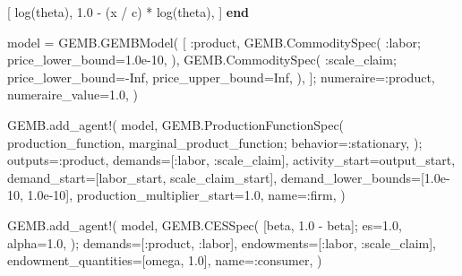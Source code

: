 \documentclass[
  letterpaper,
  DIV=11,
  numbers=noendperiod]{scrreprt}
\newenvironment{Shaded}{\begin{snugshade}}{\end{snugshade}}
\newcommand{\ConstantTok}[1]{\textcolor[rgb]{0.56,0.35,0.01}{#1}}
\newcommand{\ControlFlowTok}[1]{\textcolor[rgb]{0.00,0.23,0.31}{\textbf{#1}}}
\newcommand{\FloatTok}[1]{\textcolor[rgb]{0.68,0.00,0.00}{#1}}
\newcommand{\FunctionTok}[1]{\textcolor[rgb]{0.28,0.35,0.67}{#1}}
\newcommand{\NormalTok}[1]{\textcolor[rgb]{0.00,0.23,0.31}{#1}}
\newcommand{\OperatorTok}[1]{\textcolor[rgb]{0.37,0.37,0.37}{#1}}
\begin{document}
\begin{codelisting}
{\begin{Shaded}
\begin{Highlighting}[]
\NormalTok{    [}
        \FunctionTok{log}\NormalTok{(theta),}
        \FloatTok{1.0} \OperatorTok{{-}}\NormalTok{ (x }\OperatorTok{/}\NormalTok{ c) }\OperatorTok{*} \FunctionTok{log}\NormalTok{(theta),}
\NormalTok{    ]}
\ControlFlowTok{end}

\NormalTok{model }\OperatorTok{=}\NormalTok{ GEMB.}\FunctionTok{GEMBModel}\NormalTok{(}
\NormalTok{    [}
        \OperatorTok{:}\NormalTok{product,}
\NormalTok{        GEMB.}\FunctionTok{CommoditySpec}\NormalTok{(}
            \OperatorTok{:}\NormalTok{labor;}
\NormalTok{            price\_lower\_bound}\OperatorTok{=}\FloatTok{1.0e{-}10}\NormalTok{,}
\NormalTok{        ),}
\NormalTok{        GEMB.}\FunctionTok{CommoditySpec}\NormalTok{(}
            \OperatorTok{:}\NormalTok{scale\_claim;}
\NormalTok{            price\_lower\_bound}\OperatorTok{={-}}\ConstantTok{Inf}\NormalTok{,}
\NormalTok{            price\_upper\_bound}\OperatorTok{=}\ConstantTok{Inf}\NormalTok{,}
\NormalTok{        ),}
\NormalTok{    ];}
\NormalTok{    numeraire}\OperatorTok{=:}\NormalTok{product,}
\NormalTok{    numeraire\_value}\OperatorTok{=}\FloatTok{1.0}\NormalTok{,}
\NormalTok{)}

\NormalTok{GEMB.}\FunctionTok{add\_agent!}\NormalTok{(}
\NormalTok{    model,}
\NormalTok{    GEMB.}\FunctionTok{ProductionFunctionSpec}\NormalTok{(}
\NormalTok{        production\_function,}
\NormalTok{        marginal\_product\_function;}
\NormalTok{        behavior}\OperatorTok{=:}\NormalTok{stationary,}
\NormalTok{    );}
\NormalTok{    outputs}\OperatorTok{=:}\NormalTok{product,}
\NormalTok{    demands}\OperatorTok{=}\NormalTok{[}\OperatorTok{:}\NormalTok{labor, }\OperatorTok{:}\NormalTok{scale\_claim],}
\NormalTok{    activity\_start}\OperatorTok{=}\NormalTok{output\_start,}
\NormalTok{    demand\_start}\OperatorTok{=}\NormalTok{[labor\_start, scale\_claim\_start],}
\NormalTok{    demand\_lower\_bounds}\OperatorTok{=}\NormalTok{[}\FloatTok{1.0e{-}10}\NormalTok{, }\FloatTok{1.0e{-}10}\NormalTok{],}
\NormalTok{    production\_multiplier\_start}\OperatorTok{=}\FloatTok{1.0}\NormalTok{,}
\NormalTok{    name}\OperatorTok{=:}\NormalTok{firm,}
\NormalTok{)}

\NormalTok{GEMB.}\FunctionTok{add\_agent!}\NormalTok{(}
\NormalTok{    model,}
\NormalTok{    GEMB.}\FunctionTok{CESSpec}\NormalTok{(}
\NormalTok{        [beta, }\FloatTok{1.0} \OperatorTok{{-}}\NormalTok{ beta];}
\NormalTok{        es}\OperatorTok{=}\FloatTok{1.0}\NormalTok{,}
\NormalTok{        alpha}\OperatorTok{=}\FloatTok{1.0}\NormalTok{,}
\NormalTok{    );}
\NormalTok{    demands}\OperatorTok{=}\NormalTok{[}\OperatorTok{:}\NormalTok{product, }\OperatorTok{:}\NormalTok{labor],}
\NormalTok{    endowments}\OperatorTok{=}\NormalTok{[}\OperatorTok{:}\NormalTok{labor, }\OperatorTok{:}\NormalTok{scale\_claim],}
\NormalTok{    endowment\_quantities}\OperatorTok{=}\NormalTok{[omega, }\FloatTok{1.0}\NormalTok{],}
\NormalTok{    name}\OperatorTok{=:}\NormalTok{consumer,}
\NormalTok{)}


\end{Highlighting}
\end{Shaded}}
\end{codelisting}
\end{document}
